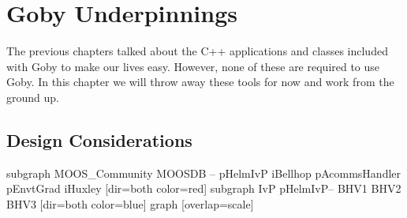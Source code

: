 \chapter{Goby Underpinnings} \label{chap:underpinnings}

The previous chapters talked about the C++ applications and classes included with Goby to make our lives easy. However, none of these are required to use Goby. In this chapter we will throw away these tools for now and work from the ground up.

\section{Design Considerations}

{
    subgraph MOOS_Community {
    MOOSDB -- { pHelmIvP iBellhop pAcommsHandler pEnvtGrad iHuxley } [dir=both color=red]
    }
    subgraph IvP { 
    pHelmIvP-- { BHV1 BHV2 BHV3 } [dir=both color=blue]
    }
graph [overlap=scale]
}

